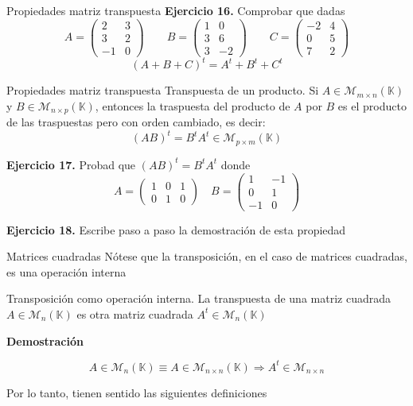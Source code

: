 \documentclass[
  ignorenonframetext,
]{beamer}
\begin{document}
\begin{frame}{Propiedades matriz transpuesta}
\protect\hypertarget{propiedades-matriz-transpuesta-2}{}
\textbf{Ejercicio 16.} Comprobar que dadas
\[A = \begin{pmatrix}2&3\\3&2\\-1&0\end{pmatrix}\qquad B=\begin{pmatrix}1&0\\3&6\\3&-2\end{pmatrix}\qquad C = \begin{pmatrix}-2&4\\0&5\\7&2\end{pmatrix}\]
\[(A+B+C)^t=A^t+B^t+C^t\]
\end{frame}

\begin{frame}{Propiedades matriz transpuesta}
\protect\hypertarget{propiedades-matriz-transpuesta-3}{}
Transpuesta de un producto. Si
\(A\in\mathcal{M}_{m\times n}(\mathbb{K})\) y
\(B\in\mathcal{M}_{n\times p}(\mathbb{K})\), entonces la traspuesta del
producto de \(A\) por \(B\) es el producto de las traspuestas pero con
orden cambiado, es decir:
\[(AB)^t=B^tA^t\in\mathcal{M}_{p\times m}(\mathbb{K})\]

\textbf{Ejercicio 17.} Probad que \((AB)^t=B^tA^t\) donde
\[A=\begin{pmatrix}1&0&1\\0&1&0\end{pmatrix}\quad B = \begin{pmatrix}1&-1\\0&1\\-1&0\end{pmatrix}\]

\textbf{Ejercicio 18.} Escribe paso a paso la demostración de esta
propiedad
\end{frame}

\begin{frame}{Matrices cuadradas}
\protect\hypertarget{matrices-cuadradas-7}{}
Nótese que la transposición, en el caso de matrices cuadradas, es una
operación interna

Transposición como operación interna. La transpuesta de una matriz
cuadrada \(A\in\mathcal{M}_n(\mathbb{K})\) es otra matriz cuadrada
\(A^t\in\mathcal{M}_n(\mathbb{K})\)

\textbf{Demostración}

\[A\in\mathcal{M}_n(\mathbb{K})\equiv A\in\mathcal{M}_{n\times n}(\mathbb{K})\Rightarrow A^t\in\mathcal{M}_{n\times n}\]

Por lo tanto, tienen sentido las siguientes definiciones
\end{frame}
\end{document}
